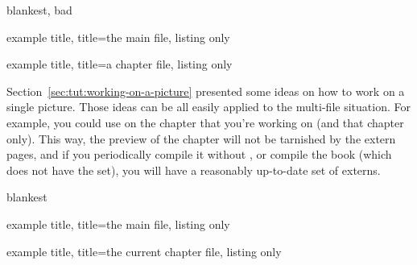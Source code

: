 \documentclass[a4paper,11pt]{article}
\begin{document}
\begin{tcboxedraster}[raster columns=2, raster valign=top]{blankest, bad}
  \begin{tcblisting}{example title, title=the main file, listing only}

  \end{tcblisting}
  \begin{tcblisting}{example title, title=a chapter file, listing only}
  \end{tcblisting}
\end{tcboxedraster}

\pagebreak %

Section~\ref{sec:tut:working-on-a-picture} presented some ideas on how to work
on a single picture.  Those ideas can be all easily applied to the multi-file
situation.  For example, you could use  on the chapter that you're
working on (and that chapter only).  This way, the preview of the chapter will
not be tarnished by the extern pages, and if you periodically compile it
without , or compile the book (which does not have the 
set), you will have a reasonably up-to-date set of externs.

\begin{tcboxedraster}[raster columns=2, raster valign=top]{blankest}
  \begin{tcblisting}{example title, title=the main file, listing only}

  \end{tcblisting}
  \begin{tcblisting}{example title, title=the current chapter file, listing only}
  \end{tcblisting}
\end{tcboxedraster}
\end{document}
